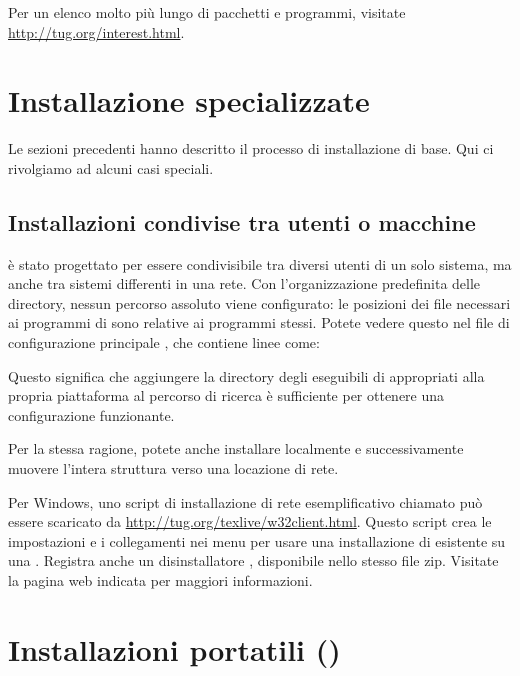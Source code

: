 \documentclass{article}
\begin{document}
Per un elenco molto più lungo di pacchetti e programmi, visitate
\url{http://tug.org/interest.html}.


\section{Installazione specializzate}

Le sezioni precedenti hanno descritto il processo di installazione di base.
Qui ci rivolgiamo ad alcuni casi speciali.

\subsection{Installazioni condivise tra utenti o macchine}
\label{sec:sharedinstall}

\TL{} è stato progettato per essere condivisibile tra diversi utenti di un
solo sistema, ma anche tra sistemi differenti in una rete. Con
l'organizzazione predefinita delle directory, nessun percorso assoluto
viene configurato: le posizioni dei file necessari ai programmi di \TL{}
sono relative ai programmi stessi. Potete vedere questo nel file di
configurazione principale , che
contiene linee come:%
Questo significa che aggiungere la directory degli eseguibili di \TL{}
appropriati alla propria piattaforma al percorso di ricerca è sufficiente
per ottenere una configurazione funzionante.

Per la stessa ragione, potete anche installare \TL{} localmente e
successivamente muovere l'intera struttura verso una locazione di rete.

Per Windows, uno script di installazione di rete esemplificativo chiamato
 può essere scaricato da
\url{http://tug.org/texlive/w32client.html}. Questo script crea le
impostazioni e i collegamenti nei menu per usare una installazione di
\TL{} esistente su una . Registra anche un disinstallatore
, disponibile nello stesso file zip. Visitate la
pagina web indicata per maggiori informazioni.


\section{Installazioni portatili (\USB)}
\label{sec:portable-tl}
\end{document}
